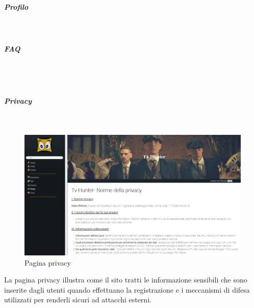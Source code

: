 \subparagraph{Profilo}
~\\


\subparagraph{FAQ} 
~\\

~\\
\subparagraph{Privacy}
~\\

\begin{figure}[H]
	\centerline{\includegraphics[scale= 0.4]{img/privacy.png}}
	\caption{Pagina privacy}
	
\end{figure}
La pagina privacy illustra come il sito tratti le informazione sensibili che sono inserite dagli utenti quando effettuano la registrazione e i meccanismi di difesa utilizzati per renderli sicuri ad attacchi esterni. 















